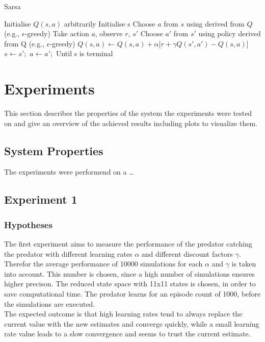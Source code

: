 \documentclass[11pt]{article}
\begin{document}
\begin{algorithm}
\caption{Sarsa}
\begin{algorithmic}
\label{sarsa}
\STATE Initialise $Q(s,a)$ arbitrarily
\STATE Initialise s
\STATE Choose $a$ from $s$ using derived from $Q$ (e.g., $\epsilon$-greedy)
\STATE Take action $a$, observe $r$, $s'$
\STATE Choose $a'$ from $s'$ using policy derived from Q (e.g., $\epsilon$-greedy)
\STATE $Q(s,a) \leftarrow Q(s,a) + \alpha \lbrack r + \gamma Q(s',a') - Q(s,a)\rbrack$
\STATE $s \leftarrow s';$ $a \leftarrow a';$
\ENDFOR
\STATE Until s is terminal
\ENDFOR
\end{algorithmic}
\end{algorithm}


\section{Experiments}
This section describes the properties of the system the experiments were tested on and give an overview of the achieved results including plots to visualize them.

\subsection{System Properties}
The experiments were performend on a \dots

\subsection{Experiment 1}

\subsubsection{Hypotheses}
The first experiment aims to measure the performance of the predator catching the predator with different learning rates $\alpha$ and different discount factors $\gamma$. Therefor the average performance of 10000 simulations for each $\alpha$ and $\gamma$ is  taken into account. This number is chosen, since a high number of simulations ensures higher precison. The reduced state space  with 11x11 states is chosen, in order to save computational time. The predator learns for an episode count of 1000, before the simulations are executed.\\
The expected outcome is that high learning rates tend to always replace the current value with the new estimates and converge quickly, while a small learning rate value leads to a slow convergence and seems to trust the current estimate.
\end{document}
